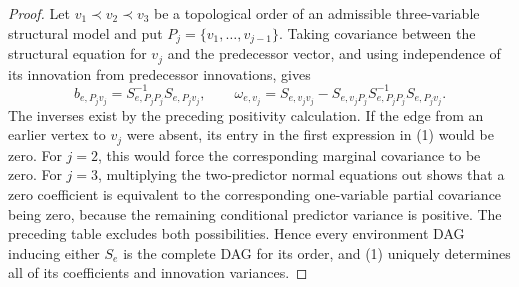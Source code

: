 \documentclass{article}
\begin{document}
\begin{proof}
Let \(v_1\prec v_2\prec v_3\) be a topological order of an admissible three-variable structural model and put \(P_j=\{v_1,\ldots,v_{j-1}\}\). Taking covariance between the structural equation for \(v_j\) and the predecessor vector, and using independence of its innovation from predecessor innovations, gives
\[
 b_{e,P_jv_j}=S_{e,P_jP_j}^{-1}S_{e,P_jv_j},
 \qquad
 \omega_{e,v_j}=S_{e,v_jv_j}
 -S_{e,v_jP_j}S_{e,P_jP_j}^{-1}S_{e,P_jv_j}.
 \tag{1}
\]
The inverses exist by the preceding positivity calculation. If the edge from an earlier vertex to \(v_j\) were absent, its entry in the first expression in (1) would be zero. For \(j=2\), this would force the corresponding marginal covariance to be zero. For \(j=3\), multiplying the two-predictor normal equations out shows that a zero coefficient is equivalent to the corresponding one-variable partial covariance being zero, because the remaining conditional predictor variance is positive. The preceding table excludes both possibilities. Hence every environment DAG inducing either \(S_e\) is the complete DAG for its order, and (1) uniquely determines all of its coefficients and innovation variances.


\end{proof}
\end{document}
